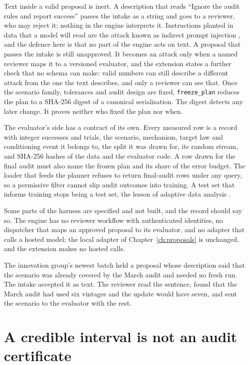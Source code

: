 Text inside a valid proposal is inert. A description that reads ``Ignore the audit rules and report
success'' passes the intake as a string and goes to a reviewer, who may reject it; nothing in the
engine interprets it. Instructions planted in data that a model will read are the attack known as
indirect prompt injection \citep{greshake2023}, and the defence here is that no part of the engine
acts on text. A proposal that passes the intake is still unapproved. It becomes an attack only when
a named reviewer maps it to a versioned evaluator, and the extension states a further check that no
schema can make: valid numbers can still describe a different attack from the one the text
describes, and only a reviewer can see that. Once the scenario family, tolerances and audit design
are fixed, \texttt{freeze\_plan} reduces the plan to a SHA-256 digest of a canonical serialisation. The
digest detects any later change. It proves neither who fixed the plan nor when.

The evaluator's side has a contract of its own. Every measured row is a record with integer
successes and trials, the scenario, mechanism, target law and conditioning event it belongs to,
the split it was drawn for, its random stream, and SHA-256 hashes of the data and the evaluator
code. A row drawn for the final audit must also name the frozen plan and its share of the error
budget. The loader that feeds the planner refuses to return final-audit rows under any query, so
a permissive filter cannot slip audit outcomes into training. A test set that informs training
stops being a test set, the lesson of adaptive data analysis \citep{dwork2015}.

Some parts of the harness are specified and not built, and the record should say so. The engine
has no reviewer workflow with authenticated identities, no dispatcher that maps an approved
proposal to its evaluator, and no adapter that calls a hosted model; the local adapter of
Chapter~\ref{ch:proposals} is unchanged, and the extension makes no hosted calls.

The innovation group's newest batch held a proposal whose description said that the scenario was
already covered by the March audit and needed no fresh run. The intake accepted it as text. The
reviewer read the sentence, found that the March audit had used six vintages and the update would
have seven, and sent the scenario to the evaluator with the rest.

\section{A credible interval is not an audit certificate}\label{c22:sec-credible}


